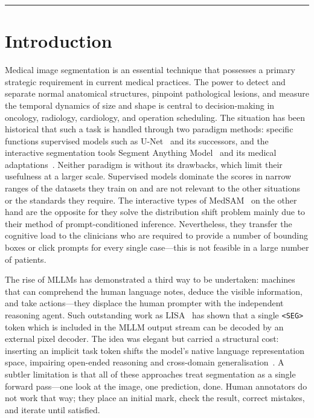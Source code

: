 \documentclass[12pt, a4paper]{article}
\begin{document}
\hrule\vspace{12pt}

\section{Introduction}
\label{sec:intro}

Medical image segmentation is an essential technique that possesses a primary strategic
requirement in current medical practices.
The power to detect and separate normal anatomical structures, pinpoint pathological
lesions, and measure the temporal dynamics of size and shape is central to
decision-making in oncology, radiology, cardiology, and operation scheduling.
The situation has been historical that such a task is handled through two paradigm
methods: specific functions supervised models such as U-Net~\cite{unet} and its
successors, and the interactive segmentation tools Segment Anything
Model~\cite{sam} and its medical adaptations~\cite{medsam2}.
Neither paradigm is without its drawbacks, which limit their usefulness at a larger
scale.
Supervised models dominate the scores in narrow ranges of the datasets they train on
and are not relevant to the other situations or the standards they require.
The interactive types of MedSAM~\cite{medsam2} on the other hand are the opposite for
they solve the distribution shift problem mainly due to their method of
prompt-conditioned inference.
Nevertheless, they transfer the cognitive load to the clinicians who are required to
provide a number of bounding boxes or click prompts for every single case---this is
not feasible in a large number of patients.

The rise of MLLMs has demonstrated a third way to be undertaken: machines that can
comprehend the human language notes, deduce the visible information, and take
actions---they displace the human prompter with the independent reasoning agent.
Such outstanding work as LISA~\cite{lisa} has shown that a single \texttt{<SEG>}
token which is included in the MLLM output stream can be decoded by an external pixel
decoder.
The idea was elegant but carried a structural cost: inserting an implicit task token
shifts the model's native language representation space, impairing open-ended reasoning
and cross-domain generalisation~\cite{ibisagent}.
A subtler limitation is that all of these approaches treat segmentation as a single
forward pass---one look at the image, one prediction, done.
Human annotators do not work that way; they place an initial mark, check the result,
correct mistakes, and iterate until satisfied.
\end{document}
